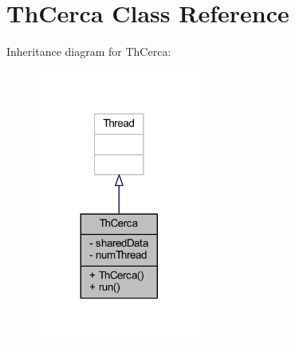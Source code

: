 \hypertarget{classmain_1_1_th_cerca}{}\section{Th\+Cerca Class Reference}
\label{classmain_1_1_th_cerca}


Inheritance diagram for Th\+Cerca\+:
\nopagebreak
\begin{figure}[H]
\begin{center}
\leavevmode
\includegraphics[width=152pt]{classmain_1_1_th_cerca__inherit__graph}
\end{center}
\end{figure}



